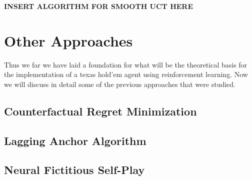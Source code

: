 \textbf{INSERT ALGORITHM FOR SMOOTH UCT HERE}

\section{Other Approaches}\label{sec:thImplementations}
Thus we far we have laid a foundation for what will be the theoretical basis for the implementation of a
texas hold'em agent using reinforcement learning.
Now we will discuss in detail some of the previous approaches that were studied.

\subsection{Counterfactual Regret Minimization}\label{subsec:thCFR}

\subsection{Lagging Anchor Algorithm}\label{subsec:thRL}

\subsection{Neural Fictitious Self-Play}\label{subsec:thNFSP}

